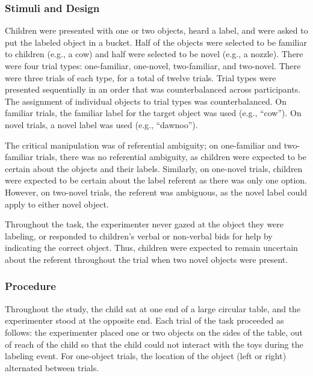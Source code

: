 \documentclass[10pt, letterpaper]{article}
\begin{document}
\subsubsection{Stimuli and Design}\label{stimuli-and-design}

Children were presented with one or two objects, heard a label, and were
asked to put the labeled object in a bucket. Half of the objects were
selected to be familiar to children (e.g., a cow) and half were selected
to be novel (e.g., a nozzle). There were four trial types: one-familiar,
one-novel, two-familiar, and two-novel. There were three trials of each
type, for a total of twelve trials. Trial types were presented
sequentially in an order that was counterbalanced across participants.
The assignment of individual objects to trial types was counterbalanced.
On familiar trials, the familiar label for the target object was used
(e.g., ``cow''). On novel trials, a novel label was used (e.g.,
``dawnoo'').

The critical manipulation was of referential ambiguity; on one-familiar
and two-familiar trials, there was no referential ambiguity, as children
were expected to be certain about the objects and their labels.
Similarly, on one-novel trials, children were expected to be certain
about the label referent as there was only one option. However, on
two-novel trials, the referent was ambiguous, as the novel label could
apply to either novel object.

Throughout the task, the experimenter never gazed at the object they
were labeling, or responded to children's verbal or non-verbal bids for
help by indicating the correct object. Thus, children were expected to
remain uncertain about the referent throughout the trial when two novel
objects were present.

\subsubsection{Procedure}\label{procedure}

Throughout the study, the child sat at one end of a large circular
table, and the experimenter stood at the opposite end. Each trial of the
task proceeded as follows: the experimenter placed one or two objects on
the sides of the table, out of reach of the child so that the child
could not interact with the toys during the labeling event. For
one-object trials, the location of the object (left or right) alternated
between trials.
\end{document}
